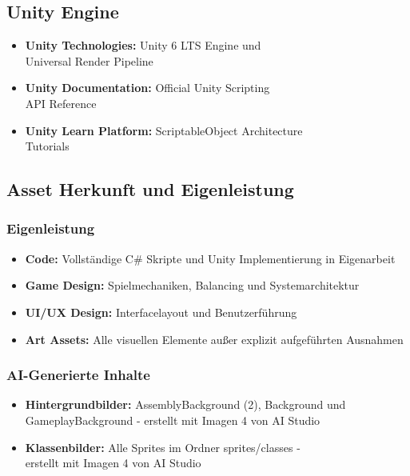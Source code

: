 \subsection{Unity Engine}
\begin{itemize}
    \item \textbf{Unity Technologies:} Unity 6 LTS Engine und \\
          Universal Render Pipeline
    \item \textbf{Unity Documentation:} Official Unity Scripting \\
          API Reference
    \item \textbf{Unity Learn Platform:} ScriptableObject Architecture \\
          Tutorials
\end{itemize}

\subsection{Asset Herkunft und Eigenleistung}

\subsubsection{Eigenleistung}
\begin{itemize}
    \item \textbf{Code:} Vollständige C\# Skripte und Unity Implementierung in Eigenarbeit
    \item \textbf{Game Design:} Spielmechaniken, Balancing und Systemarchitektur
    \item \textbf{UI/UX Design:} Interfacelayout und Benutzerführung
    \item \textbf{Art Assets:} Alle visuellen Elemente außer explizit aufgeführten Ausnahmen
\end{itemize}

\subsubsection{AI-Generierte Inhalte}
\begin{itemize}
    \item \textbf{Hintergrundbilder:} AssemblyBackground (2), Background und \\
          GameplayBackground - erstellt mit Imagen 4 von AI Studio
    \item \textbf{Klassenbilder:} Alle Sprites im Ordner sprites/classes - \\
          erstellt mit Imagen 4 von AI Studio
\end{itemize}

